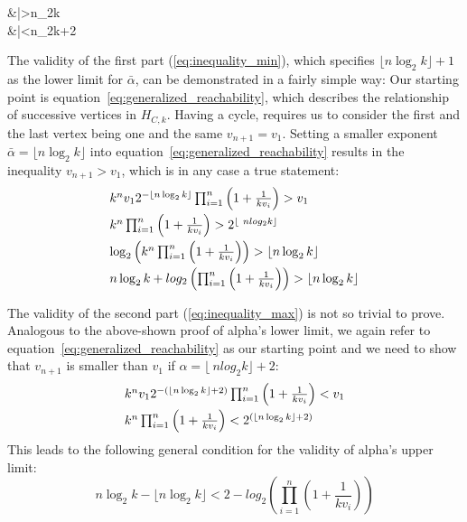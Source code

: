 \begin{samepage}
	\begin{flalign}
		\label{eq:inequality_min}
		&\bar\alpha>\lfloor n\log_2k\rfloor\\	
		\label{eq:inequality_max}
		&\bar\alpha<\lfloor n\log_2k\rfloor+2
	\end{flalign}
\end{samepage}

The validity of the first part (\ref{eq:inequality_min}), which specifies $\lfloor n\log_2k\rfloor+1$ as the lower limit for $\bar\alpha$, can be demonstrated in a fairly simple way: Our starting point is equation~\ref{eq:generalized_reachability}, which describes the relationship of successive vertices in $H_{C,k}$. Having a cycle, requires us to consider the first and the last vertex being one and the same $v_{n+1}=v_1$. Setting a smaller exponent $\bar\alpha=\lfloor n\log_2k\rfloor$ into equation~\ref{eq:generalized_reachability} results in the inequality $v_{n+1}>v_1$, which is in any case a true statement:
\begin{equation*}
	\begin{array}{l}
		k^nv_12^{-\lfloor n\log_2k\rfloor}\prod_{i=1}^{n}\left(1+\frac{1}{kv_{i}}\right)>v_1
		\\[\medskipamount]
		k^n\prod_{i=1}^{n}\left(1+\frac{1}{kv_{i}}\right)>2^{\lfloor\ nlog_2k\rfloor}
		\\[\medskipamount]
		\log_2\left(k^n\prod_{i=1}^{n}\left(1+\frac{1}{kv_{i}}\right)\right)>\lfloor n\log_2k\rfloor
		\\[\medskipamount]
		n\log_2k+log_2\left(\prod_{i=1}^{n}\left(1+\frac{1}{kv_{i}}\right)\right)>\lfloor n\log_2k\rfloor
	\end{array}	
\end{equation*}

The validity of the second part (\ref{eq:inequality_max}) is not so trivial to prove. Analogous to the above-shown proof of alpha's lower limit, we again refer to equation~\ref{eq:generalized_reachability} as our starting point and we need to show that $v_{n+1}$ is smaller than $v_1$ if $\alpha=\lfloor\ nlog_2k\rfloor+2$:
\begin{equation*}
	\begin{array}{l}
		k^nv_12^{-\left(\lfloor n\log_2k\rfloor+2\right)}\prod_{i=1}^{n}\left(1+\frac{1}{kv_{i}}\right)<v_1
		\\[\medskipamount]
		k^n\prod_{i=1}^{n}\left(1+\frac{1}{kv_{i}}\right)<2^{\left(\lfloor n\log_2k\rfloor+2\right)}
	\end{array}	
\end{equation*}
This leads to the following general condition for the validity of alpha's upper limit:
\begin{equation}
\label{eq:condition_max}
	n\log_2k-\lfloor n\log_2k\rfloor<2-log_2\left(\prod_{i=1}^{n}\left(1+\frac{1}{kv_{i}}\right)\right)
\end{equation}

